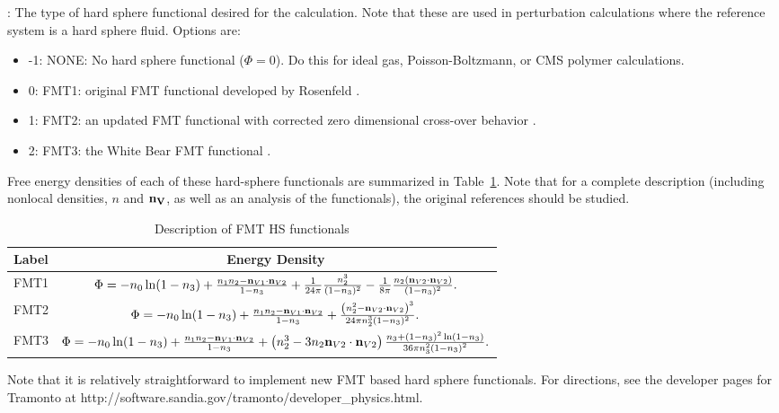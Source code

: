 \documentclass[10pt,onecolumn]{article}
\begin{document}
\vspace{0.1in}
: The type of hard sphere functional
desired for the calculation. Note that these are used in perturbation calculations where
the reference system is a hard sphere fluid.  Options are:
\begin{itemize}
\item{-1: NONE: No hard sphere functional ($\Phi=0$).
Do this for ideal gas, Poisson-Boltzmann, or CMS polymer calculations.}
\item{0: FMT1: original FMT functional developed by Rosenfeld \cite{rosenfeld1}.}
\item{1: FMT2: an updated FMT functional with corrected zero dimensional cross-over
behavior \cite{rosenfeld2,rosenfeld3}}.
\item{2: FMT3: the White Bear FMT functional \cite{roth}.}
\end{itemize}

Free energy densities of each of these hard-sphere functionals are summarized in
Table~\ref{tab:fmteq}.  Note that for a complete description (including nonlocal densities, $n$ and ${\bf n_V}$, as well
as an analysis of the functionals), the original references should be studied.
\begin{table}[h]
\center\begin{tabular}{|l|c|} \hline
Label & Energy Density \\ \hline
FMT1 & 
$
\Phi = -n_0 \ln(1-n_3)
         + {{n_1n_2 - {\bf n}_{V1} \cdot {\bf n}_{V2}}\over{1-n_3}}
       + {{1}\over{24\pi}} {{n_2^3}\over{(1-n_3)^2}}
               - {{1}\over{8\pi}} {{n_2({\bf n}_{V2}\cdot{\bf n}_{V2})}\over{(1-n_3)^2}}.
$ \\ 
FMT2 &
$
\Phi = -n_0 \ln(1-n_3)
         +  {{n_1n_2 - {\bf n}_{V1} \cdot {\bf n}_{V2}}\over{1-n_3}}  
         + { { \left(n_2^2 - {\bf n}_{V2} \cdot {\bf n}_{V2} \right)^3}
                         \over {24 \pi n_2^3 (1-n_3)^2} }.
$ \\
FMT3 &
$
\Phi = -n_0 \ln(1-n_3)
         +  {{n_1n_2 - {\bf n}_{V1} \cdot {\bf n}_{V2}}\over{1-n_3}}  
          +  \left(n_2^3 - 3n_2 {\bf n}_{V2} \cdot {\bf n}_{V2}  \right) 
     {  {n_3 + \left(1-n_3 \right)^2 \ln \left(1-n_3\right)} \over {36 \pi n_3^2 \left(1-n_3\right)^2} }.
$ \\ \hline
\end{tabular}
\caption{Description of FMT HS functionals}
\label{tab:fmteq}
\end{table}

\noindent Note that it is relatively straightforward to implement new FMT based hard sphere functionals.  For directions, see the developer pages for Tramonto at http://software.sandia.gov/tramonto/developer\_physics.html. 
\end{document}
